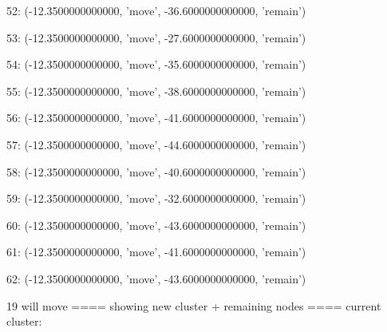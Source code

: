 52: (-12.3500000000000, 'move', -36.6000000000000, 'remain')


53: (-12.3500000000000, 'move', -27.6000000000000, 'remain')


54: (-12.3500000000000, 'move', -35.6000000000000, 'remain')


55: (-12.3500000000000, 'move', -38.6000000000000, 'remain')


56: (-12.3500000000000, 'move', -41.6000000000000, 'remain')


57: (-12.3500000000000, 'move', -44.6000000000000, 'remain')


58: (-12.3500000000000, 'move', -40.6000000000000, 'remain')


59: (-12.3500000000000, 'move', -32.6000000000000, 'remain')


60: (-12.3500000000000, 'move', -43.6000000000000, 'remain')


61: (-12.3500000000000, 'move', -41.6000000000000, 'remain')


62: (-12.3500000000000, 'move', -43.6000000000000, 'remain')


19 will move
==== showing new cluster + remaining nodes ====
current cluster:


